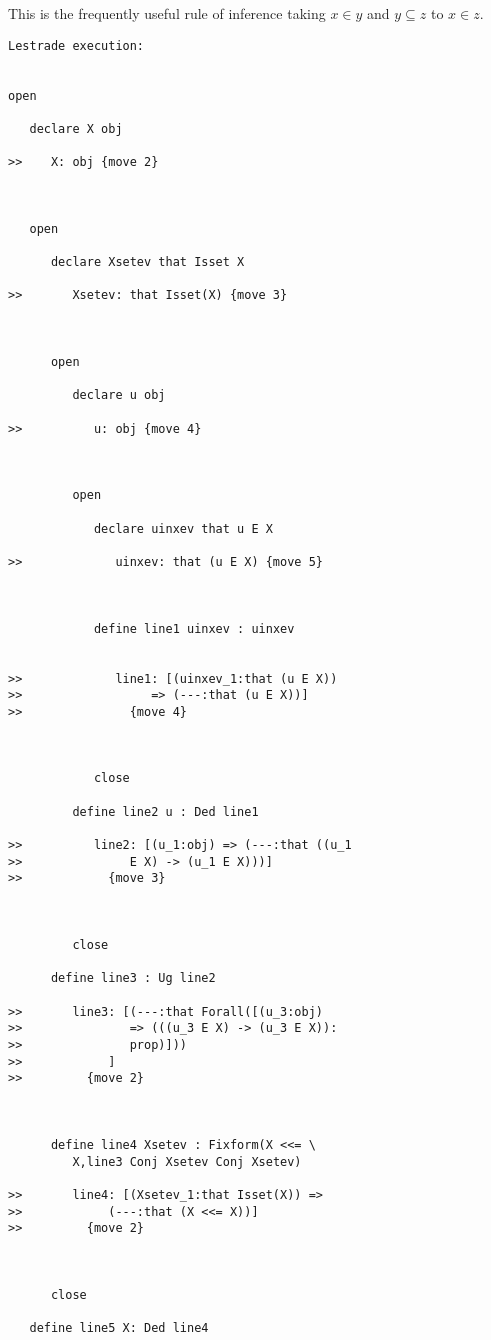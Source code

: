 \documentclass[12pt]{article}
\begin{document}
This is the frequently useful rule of inference taking $x \in y$ and $y \subseteq z$ to $x \in z$.



\begin{verbatim}Lestrade execution:


open

   declare X obj

>>    X: obj {move 2}



   open

      declare Xsetev that Isset X

>>       Xsetev: that Isset(X) {move 3}



      open

         declare u obj

>>          u: obj {move 4}



         open

            declare uinxev that u E X

>>             uinxev: that (u E X) {move 5}



            define line1 uinxev : uinxev


>>             line1: [(uinxev_1:that (u E X))
>>                  => (---:that (u E X))]
>>               {move 4}



            close

         define line2 u : Ded line1

>>          line2: [(u_1:obj) => (---:that ((u_1
>>               E X) -> (u_1 E X)))]
>>            {move 3}



         close

      define line3 : Ug line2

>>       line3: [(---:that Forall([(u_3:obj)
>>               => (((u_3 E X) -> (u_3 E X)):
>>               prop)]))
>>            ]
>>         {move 2}



      define line4 Xsetev : Fixform(X <<= \
         X,line3 Conj Xsetev Conj Xsetev)

>>       line4: [(Xsetev_1:that Isset(X)) =>
>>            (---:that (X <<= X))]
>>         {move 2}



      close

   define line5 X: Ded line4


\end{verbatim}
\end{document}
